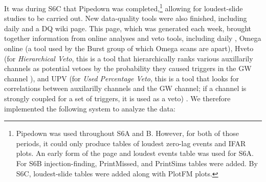 It was during S6C that Pipedown was completed,\footnote{Pipedown was used throughout S6A and B. However, for both of those periods, it could only produce tables of loudest zero-lag events and IFAR plots. An early form of the \ihope page and loudest events table was used for S6A. For S6B injection-finding, PrintMissed, and PrintSims tables were added. By S6C, loudest-slide tables were added along with PlotFM plots.} allowing for loudest-slide studies to be carried out. New data-quality tools were also finished, including daily \ihope and a DQ wiki page. This page, which was generated each week, brought together information from online analyses and veto tools, including daily \ihope, Omega online (a tool used by the Burst group of which Omega scans are apart), Hveto (for \emph{Hierarchical Veto}, this is a tool that hierarchically ranks various auxillarily channels as potential vetoes by the probability they caused triggers in the \ac{GW} channel \cite{ref:https://wiki.ligo.org/DetChar/HvetoDoc}), and UPV (for \emph{Used Percentage Veto}, this is a tool that looks for correlations between auxilarilly channels and the \ac{GW} channel; if a channel is strongly coupled for a set of triggers, it is used as a veto) \cite{ref:https://virgo.physics.carleton.edu/trac/UPV-trac/wiki}. We therefore implemented the following system to analyze the data:
